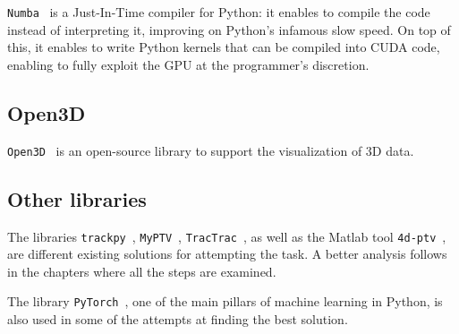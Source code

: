 \texttt{Numba}~\cite{numba} is a Just-In-Time compiler for Python: it enables to compile the code instead of interpreting it, improving on Python's infamous slow speed.
On top of this, it enables to write Python kernels that can be compiled into CUDA code, enabling to fully exploit the GPU at the programmer's discretion.

\subsection{Open3D}

\texttt{Open3D}~\cite{open3d} is an open-source library to support the visualization of 3D data.

\subsection{Other libraries}

The libraries \texttt{trackpy}~\cite{trackpy}, \texttt{MyPTV}~\cite{myptv}, \texttt{TracTrac}~\cite{tractrac}, as well as the Matlab tool \texttt{4d-ptv}~\cite{fourdptv}, are different existing solutions for attempting the task. A better analysis follows in the chapters where all the steps are examined.

The library \texttt{PyTorch}~\cite{pytorch}, one of the main pillars of machine learning in Python, is also used in some of the attempts at finding the best solution.
